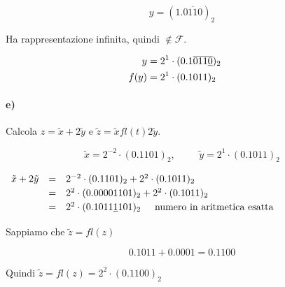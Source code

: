 \begin{equation*}
  y=(1.\overline{0110})_2
\end{equation*}

Ha rappresentazione infinita, quindi $\notin \mathcal{F}$.

\begin{equation*}
\begin{split}
  y &=2^1\cdot (0.1\overline{011\underline{0}\tikzmark{a}})_2 \hspace{.5cm}\tikzmark{b}\\
  f(y) &=2^1\cdot (0.1011)_2
\end{split}
\end{equation*}
%


\paragraph{e)} Calcola $z=\tilde{x}+2\tilde{y}$ e $\tilde{z}=\tilde{x}fl(t)2\tilde{y}$.

\begin{equation*}
  \tilde{x} = 2^{-2}\cdot (0.1101)_2, \hspace{1cm} \tilde{y} = 2^1\cdot (0.1011)_2
\end{equation*}

\begin{center}$
\renewcommand\arraystretch{1.2}
\begin{array}{rcl}
  \tilde{x}+2\tilde{y}  & = & 2^{-2}\cdot (0.1101)_2 + 2^2\cdot (0.1011)_2\\
                        & = & 2^2\cdot (0.00001101)_2 + 2^2\cdot (0.1011)_2\\
                        & = & 2^2\cdot (0.1011\underline{1}101)_2 \hspace{.5cm} \mbox{numero in aritmetica esatta}
\end{array}
$\end{center}

Sappiamo che $\tilde{z}=fl(z)$

\begin{equation*}
  0.1011+0.0001=0.1100
\end{equation*}

Quindi $\tilde{z}=fl(z)=2^2\cdot (0.1100)_2$


